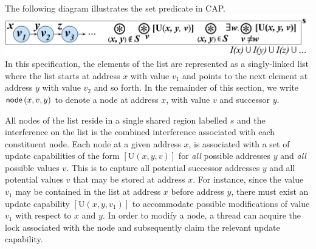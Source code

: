The following diagram illustrates the set predicate in CAP.\\
%
\includegraphics[scale=0.232]{Sections/FurtherExamples/Images/capSet.pdf}\\
%
%
%
In this specification, the elements of the list are represented as a singly-linked list where the list starts at address $x$ with value $v_1$ and points to the next element at address $y$ with value $v_2$ and so forth. In the remainder of this section, we write $\textsf{node}\left(x, v, y\right)$ to denote a node at address $x$, with value $v$ and successor $y$. 

All nodes of the list reside in a single shared region labelled $s$ and the interference on the list is the combined interference associated with each constituent node. 
Each node at a given address $x$, is associated with a set of update capabilities of the form $[\text{U}(x, y, v)]$ for \emph{all} possible addresses $y$ and \emph{all} possible values $v$. This is to capture all potential successor addresses $y$ and all potential values $v$ that may be stored at address $x$. For instance, since the value $v_{1}$ may be contained in the list at address $x$ before address $y$, there must exist an update capability $[\text{U}(x, y, v_1)]$ to accommodate possible modifications of value $v_{1}$ with respect to $x$ and $y$. In order to modify a node, a thread can acquire the lock associated with the node and subsequently claim the relevant update capability.
% 

